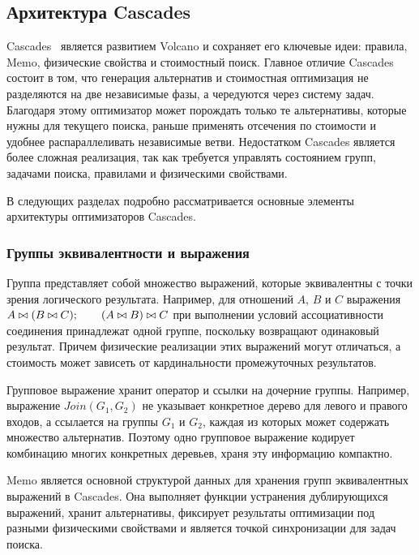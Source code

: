 \documentclass[14pt, russian]{scrartcl}
\begin{document}
\subsection{Архитектура Cascades}

Cascades~\cite{Graefe1995,XuColumbia1998} является развитием Volcano и
сохраняет его ключевые идеи: правила, Memo, физические свойства и стоимостный
поиск. Главное отличие Cascades состоит в том, что генерация альтернатив и
стоимостная оптимизация не разделяются на две независимые фазы, а чередуются
через систему задач. Благодаря этому оптимизатор может порождать только те
альтернативы, которые нужны для текущего поиска, раньше применять отсечения по
стоимости и удобнее распараллеливать независимые ветви. Недостатком Cascades
является более сложная реализация, так как требуется управлять состоянием групп,
задачами поиска, правилами и физическими свойствами.

В следующих разделах подробно рассматривается основные элементы архитектуры
оптимизаторов Cascades.

\subsubsection{Группы эквивалентности и выражения}

Группа представляет собой множество выражений, которые эквивалентны с
точки зрения логического результата. Например, для отношений \(A\), \(B\) и
\(C\) выражения \( A \bowtie (B \bowtie C) ; \qquad{} (A \bowtie B) \bowtie C \)
при выполнении условий ассоциативности соединения принадлежат одной группе,
поскольку возвращают одинаковый результат. Причем физические реализации этих
выражений могут отличаться, а стоимость может зависеть от кардинальности
промежуточных результатов.

Групповое выражение хранит оператор и ссылки на дочерние группы. Например,
выражение \(Join(G_1, G_2)\) не указывает конкретное дерево для левого и правого
входов, а ссылается на группы \(G_1\) и \(G_2\), каждая из которых может
содержать множество альтернатив. Поэтому одно групповое выражение кодирует
комбинацию многих конкретных деревьев, храня эту информацию компактно.

Memo является основной структурой данных для хранения групп эквивалентных
выражений в Cascades. Она выполняет функции устранения дублирующихся выражений,
хранит альтернативы, фиксирует результаты оптимизации под разными физическими
свойствами и является точкой синхронизации для задач поиска.
\end{document}
